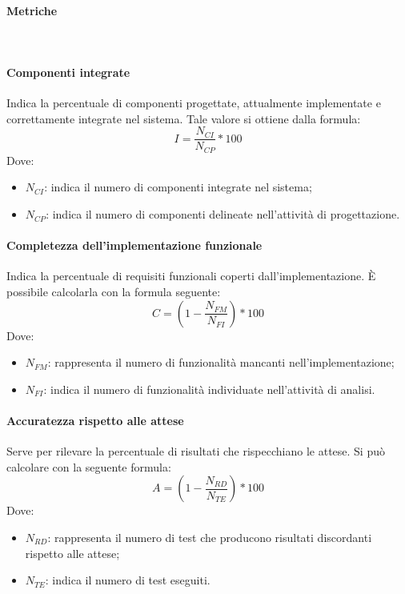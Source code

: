 \documentclass[../NormeDiProgetto.tex]{subfiles}
\begin{document}
			\paragraph{Metriche}\mbox{}\\
				\paragraph{Componenti integrate}
				Indica la percentuale di componenti progettate, attualmente implementate e correttamente integrate nel sistema.
				Tale valore si ottiene dalla formula:
				\begin{equation*}
					I = \frac{N_{CI}}{N_{CP}} * 100
				\end{equation*}
				Dove:
				\begin{itemize}
					\item \textbf{$N_{CI}$}: indica il numero di componenti integrate nel sistema;
					\item \textbf{$N_{CP}$}: indica il numero di componenti delineate nell'attività di progettazione.
				\end{itemize}
				
			\paragraph{Completezza dell'implementazione funzionale}
				Indica la percentuale di requisiti funzionali coperti dall'implementazione.
				È possibile calcolarla con la formula seguente:
				\begin{equation*}
					C = (1 - \frac{N_{FM}}{N_{FI}}) * 100
				\end{equation*}
				Dove:
				\begin{itemize}
					\item \textbf{$N_{FM}$}: rappresenta il numero di funzionalità mancanti nell'implementazione;
					 \item \textbf{$N_{FI}$}: indica il numero di funzionalità individuate nell'attività di analisi.
				\end{itemize}

			\paragraph{Accuratezza rispetto alle attese}
				Serve per rilevare la percentuale di risultati che rispecchiano le attese.
				Si può calcolare con la seguente formula:
				\begin{equation*}
					A = (1 - \frac{N_{RD}}{N_{TE}})*100
				\end{equation*}
				Dove:
				\begin{itemize}
					\item \textbf{$N_{RD}$}: rappresenta il numero di test che producono risultati discordanti rispetto alle attese;
					\item \textbf{$N_{TE}$}: indica il numero di test eseguiti.
				\end{itemize}
				
\end{document}
